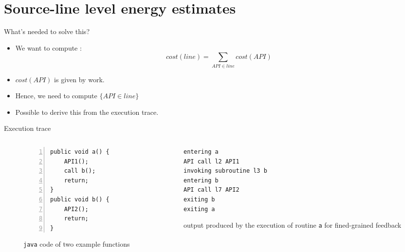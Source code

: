 \section{Source-line level energy estimates}
%
%
\begin{frame}{What's needed to solve this?}
\begin{itemize}
\item We want to compute :
$$cost(line) = \sum_{API \in line} cost(API)$$
\item $cost(API)$ is given by \lv{} \cite{linares2014mining} work.
\item Hence, we need to compute $\{API \in line\}$
\item Possible to derive this from the execution trace.
\end{itemize}
\end{frame}  
%
%
\begin{frame}[fragile]{Execution trace}
\begin{columns}
\begin{column}{0.5\textwidth}
\begin{figure}%
\centering
\begin{lstlisting}[numbers=left]
public void a() {
	API1();
	call b();
	return;
}
public void b() {
	API2();
	return;
}
\end{lstlisting}
\caption{\texttt{java} code of two example functions}
\label{fig:exfunctions}
\end{figure}
\end{column}
%
\begin{column}{0.5\textwidth}
\begin{figure}
\centering
\begin{lstlisting}
entering a
API call l2 API1
invoking subroutine l3 b
entering b
API call l7 API2
exiting b
exiting a
\end{lstlisting}
\caption{\logcat{} output produced by the execution of routine \texttt{a} for fined-grained feedback}
\label{fig:exlogcat3}
\end{figure}
\end{column}
\end{columns}
\end{frame}  
%
%
